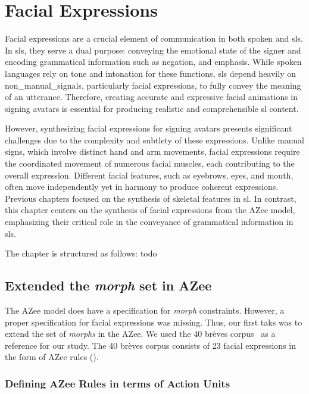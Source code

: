 \documentclass[../../main]{subfiles}
\begin{document}
\chapter{Facial Expressions}
\label{ch:facial_expressions}

Facial expressions are a crucial element of communication in both spoken and \gls{sl}s. In \gls{sl}s, they serve a dual purpose: conveying the emotional state of the signer and encoding grammatical information such as negation, and emphasis. While spoken languages rely on tone and intonation for these functions, \gls{sl}s depend heavily on \gls{non_manual_signals}, particularly facial expressions, to fully convey the meaning of an utterance. Therefore, creating accurate and expressive facial animations in signing avatars is essential for producing realistic and comprehensible \gls{sl} content.

However, synthesizing facial expressions for signing avatars presents significant challenges due to the complexity and subtlety of these expressions. Unlike manual signs, which involve distinct hand and arm movements, facial expressions require the coordinated movement of numerous facial muscles, each contributing to the overall expression. Different facial features, such as eyebrows, eyes, and mouth, often move independently yet in harmony to produce coherent expressions. Previous chapters focused on the synthesis of skeletal features in \gls{sl}. In contrast, this chapter centers on the synthesis of facial expressions from the AZee model, emphasizing their critical role in the conveyance of grammatical information in \gls{sl}s.

The chapter is structured as follows: todo

\section{Extended the \emph{morph} set in AZee}
\label{ch:facial_expressions:adding_facial_expressions_to_azee}

The AZee model does have a specification for \emph{morph} constraints. However, a proper specification for facial expressions was missing. Thus, our first taks was to extend the set of \emph{morphs} in the AZee. We used the 40 brèves corpus~\cite{challant2024extending, challant2022first} as a reference for our study. The 40 brèves corpus consists of 23 facial expressions in the form of AZee rules ().

\subsection{Defining AZee Rules in terms of Action Units}
\label{ch:facial_expressions:defining_azee_rules_in_terms_of_action_units}
\end{document}
